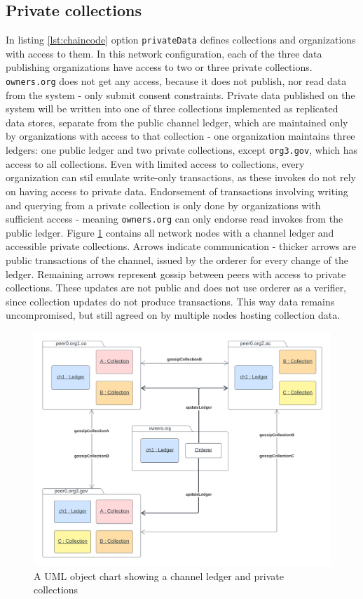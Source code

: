 \documentclass[12pt]{article}
\begin{document}
    \subsection{Private collections}
    In listing \ref{lst:chaincode} option \lstinline{privateData} defines collections and organizations with access to them. In this network configuration, each of the three data publishing organizations have access to two or three private collections. \lstinline{owners.org} does not get any access, because it does not publish, nor read data from the system - only submit consent constraints. Private data published on the system will be written into one of three collections implemented as replicated data stores, separate from the public channel ledger, which are maintained only by organizations with access to that collection - one organization maintains three ledgers: one public ledger and two private collections, except \lstinline{org3.gov}, which has access to all collections. Even with limited access to collections, every organization can stil emulate write-only transactions, as these invokes do not rely on having access to private data. Endorsement of transactions involving writing and querying from a private collection is only done by organizations with sufficient access - meaning \lstinline{owners.org} can only endorse read invokes from the public ledger. Figure \ref{fig:collections} contains all network nodes with a channel ledger and accessible private collections. Arrows indicate communication - thicker arrows are public transactions of the channel, issued by the orderer for every change of the ledger. Remaining arrows represent gossip between peers with access to private collections. These updates are not public and does not use orderer as a verifier, since collection updates do not produce transactions. This way data remains uncompromised, but still agreed on by multiple nodes hosting collection data.
    
    \begin{figure}[H]
        \includegraphics[width=\textwidth]{collections.png}
        \caption{A UML object chart showing a channel ledger and private collections}
        \label{fig:collections}
    \end{figure}
\end{document}
